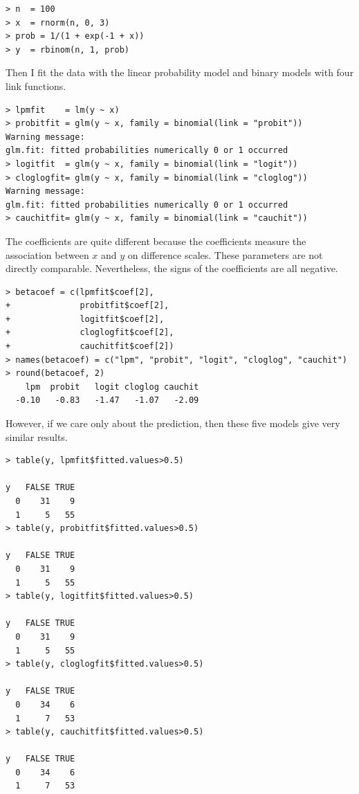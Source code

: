  
\begin{lstlisting}
> n  = 100
> x  = rnorm(n, 0, 3)
> prob = 1/(1 + exp(-1 + x))
> y  = rbinom(n, 1, prob)
\end{lstlisting}


Then I fit the data with the linear probability model and binary models with four link functions. 
\begin{lstlisting}
> lpmfit    = lm(y ~ x)
> probitfit = glm(y ~ x, family = binomial(link = "probit"))
Warning message:
glm.fit: fitted probabilities numerically 0 or 1 occurred 
> logitfit  = glm(y ~ x, family = binomial(link = "logit"))
> cloglogfit= glm(y ~ x, family = binomial(link = "cloglog"))
Warning message:
glm.fit: fitted probabilities numerically 0 or 1 occurred 
> cauchitfit= glm(y ~ x, family = binomial(link = "cauchit"))
\end{lstlisting}


 
The coefficients are quite different because the coefficients measure the association between $x$ and $y$ on difference scales. These parameters are not directly comparable.  
Nevertheless, the signs of the coefficients are all negative. 

\begin{lstlisting}
> betacoef = c(lpmfit$coef[2], 
+              probitfit$coef[2], 
+              logitfit$coef[2], 
+              cloglogfit$coef[2], 
+              cauchitfit$coef[2])
> names(betacoef) = c("lpm", "probit", "logit", "cloglog", "cauchit")
> round(betacoef, 2)
    lpm  probit   logit cloglog cauchit 
  -0.10   -0.83   -1.47   -1.07   -2.09
\end{lstlisting}


However, if we care only about the prediction, then these five models give very similar results. 

\begin{lstlisting}
> table(y, lpmfit$fitted.values>0.5)
   
y   FALSE TRUE
  0    31    9
  1     5   55
> table(y, probitfit$fitted.values>0.5)
   
y   FALSE TRUE
  0    31    9
  1     5   55
> table(y, logitfit$fitted.values>0.5)
   
y   FALSE TRUE
  0    31    9
  1     5   55
> table(y, cloglogfit$fitted.values>0.5)
   
y   FALSE TRUE
  0    34    6
  1     7   53
> table(y, cauchitfit$fitted.values>0.5)
   
y   FALSE TRUE
  0    34    6
  1     7   53
  \end{lstlisting}
  
